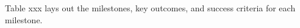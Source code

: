 \documentclass[11pt]{article}
\begin{document}

Table xxx lays out the milestones, key outcomes, and success criteria for each milestone. 
\end{document}
